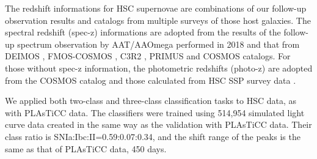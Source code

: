\documentclass[useamsfonts]{pasj01}
\begin{document}
%
%
\begin{table}[ht]
\label{tab:HSCsurvey_schedule}
\end{table}
%

The redshift informations for HSC supernovae are combinations of our follow-up observation results and catalogs from multiple surveys of those host galaxies.
The spectral redshift (spec-z) informations are adopted from the results of the follow-up spectrum observation by AAT/AAOmega performed in 2018 and that from DEIMOS \citep{DEIMOS2018}, FMOS-COSMOS \citep{FMOS-COSMOS2015}, C3R2 \citep{C3R2_2017}, PRIMUS \citep{PRIMUS2011} and COSMOS catalogs.
For those without spec-z information, the photometric redshifts (photo-z) are adopted from the COSMOS catalog and those calculated from HSC SSP survey data \citep{HSCSSP_photo-z2018}.

We applied both two-class and three-class classification tasks to HSC data, as with PLAsTiCC data.
The classifiers were trained using 514,954 simulated light curve data created in the same way as the validation with PLAsTiCC data.
Their class ratio is SNIa:Ibc:II=0.59:0.07:0.34, and the shift range of the peaks is the same as that of PLAsTiCC data, 450 days.
%
\end{document}
